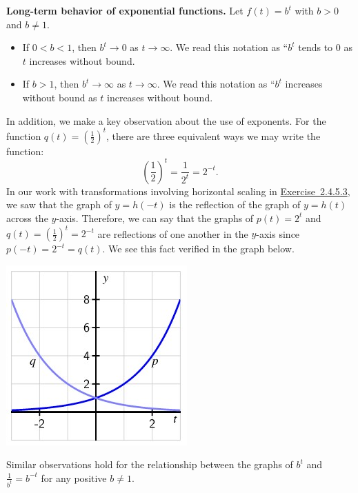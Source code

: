 \documentclass[nooutcomes]{ximera}
\begin{document}
\begin{callout}
\textbf{\Large Long-term behavior of exponential functions.}
Let \(f(t) = b^t\) with \(b \gt 0\) and \(b \ne 1\).
\begin{itemize}
\item If \(0 \lt b \lt 1\), then \(b^t \to 0\) as \(t \to \infty\).  We read this notation as ``\(b^t\) tends to \(0\) as \(t\) increases without bound.
\item If \(b \gt 1\), then \(b^t \to \infty\) as \(t \to \infty\).  We read this notation as ``\(b^t\) increases without bound as \(t\) increases without bound.
\end{itemize}
\end{callout}

In addition, we make a key observation about the use of exponents.  For the function \(q(t) = (\frac{1}{2})^t\), there are three equivalent ways we may write the function:%
\begin{equation*}
\left( \frac{1}{2} \right)^t = \frac{1}{2^t} = 2^{-t}\text{.}
\end{equation*}
In our work with transformations involving horizontal scaling in \hyperlink{ez-circular-sinusoidal-horiz-reflection}{Exercise~2.4.5.3}, we saw that the graph of \(y = h(-t)\) is the reflection of the graph of \(y = h(t)\) across the \(y\)-axis.  Therefore, we can say that the graphs of \(p(t) = 2^t\) and \(q(t) = (\frac{1}{2})^t = 2^{-t}\) are reflections of one another in the \(y\)-axis since \(p(-t) = 2^{-t} = q(t)\).  We see this fact verified in the graph below.

\begin{image}
\includegraphics{ExpText6.jpg}
\end{image}

Similar observations hold for the relationship between the graphs of \(b^{t}\) and \(\frac{1}{b^t} = b^{-t}\) for any positive \(b \ne 1\).
\end{document}
